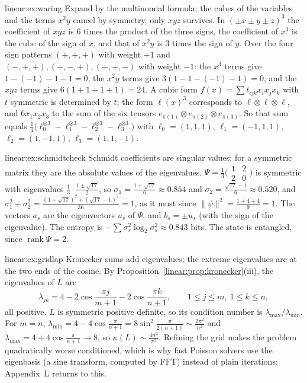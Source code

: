 \begin{solution}{linear:ex:waring}
\idea Expand by the multinomial formula; the cubes of the variables and the terms $x^2y$ cancel by symmetry, only $xyz$ survives.
\writeup In $(\pm x\pm y\pm z)^3$ the coefficient of $xyz$ is $6$ times the product of the three signs, the coefficient of $x^3$ is the
cube of the sign of $x$, and that of $x^2y$ is $3$ times the sign of $y$. Over the four sign patterns $(+,+,+)$ with weight $+1$ and
$(-,+,+),(+,-,+),(+,+,-)$ with weight $-1$: the $x^3$ terms give $1-(-1)-1-1=0$, the $x^2y$ terms give $3(1-1-(-1)-1)=0$, and the
$xyz$ terms give $6(1+1+1+1)=24$. A cubic form $f(x)=\sum t_{ijk}x_ix_jx_k$ with $t$ symmetric is determined by $t$; the form $\ell(x)^3$
corresponds to $\ell\otimes\ell\otimes\ell$, and $6x_1x_2x_3$ to the sum of the six tensors $e_{\pi(1)}\otimes e_{\pi(2)}\otimes e_{\pi(3)}$. So
that sum equals $\frac14\bigl(\ell_0^{\otimes3}-\ell_1^{\otimes3}-\ell_2^{\otimes3}-\ell_3^{\otimes3}\bigr)$ with $\ell_0=(1,1,1)$, $\ell_1=(-1,1,1)$,
$\ell_2=(1,-1,1)$, $\ell_3=(1,1,-1)$.
\end{solution}

\begin{solution}{linear:ex:schmidtcheck}
\idea Schmidt coefficients are singular values; for a symmetric matrix they are the absolute values of the eigenvalues.
\writeup $\Psi=\frac13\bigl(\begin{smallmatrix}1&2\\2&0\end{smallmatrix}\bigr)$ is symmetric with eigenvalues $\frac13\cdot\frac{1\pm\sqrt{17}}2$,
so $\sigma_1=\frac{1+\sqrt{17}}6\approx0.854$ and $\sigma_2=\frac{\sqrt{17}-1}6\approx0.520$, and
$\sigma_1^2+\sigma_2^2=\frac{(1+\sqrt{17})^2+(\sqrt{17}-1)^2}{36}=1$, as it must since $\|\psi\|^2=\frac{1+4+4}9=1$. The vectors $a_s$ are the eigenvectors $u_s$ of $\Psi$, and $b_s=\pm u_s$
(with the sign of the eigenvalue). The entropy is $-\sum\sigma_s^2\log_2\sigma_s^2\approx0.843$ bits. The state is entangled, since
$\operatorname{rank}\Psi=2$.
\end{solution}

\begin{solution}{linear:ex:gridlap}
\idea Kronecker sums add eigenvalues; the extreme eigenvalues are at the two ends of the cosine.
\writeup By Proposition~\ref{linear:prop:kronecker}(iii), the eigenvalues of $L$ are
\[
\lambda_{jk}=4-2\cos\frac{\pi j}{m+1}-2\cos\frac{\pi k}{n+1},\qquad1\le j\le m,\ 1\le k\le n,
\]
all positive. $L$ is symmetric positive definite, so its condition number is $\lambda_{\max}/\lambda_{\min}$. For $m=n$,
$\lambda_{\min}=4-4\cos\frac\pi{n+1}=8\sin^2\frac\pi{2(n+1)}\sim\frac{2\pi^2}{n^2}$ and $\lambda_{\max}=4+4\cos\frac\pi{n+1}\to8$, so
$\kappa(L)\sim\frac{4n^2}{\pi^2}$. Refining the grid makes the problem quadratically worse conditioned, which is why fast Poisson solvers
use the eigenbasis (a sine transform, computed by FFT) instead of plain iterations; Appendix~L returns to this.
\end{solution}

